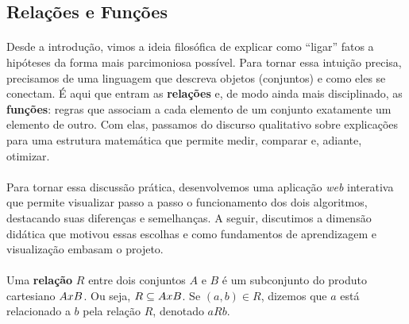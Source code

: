 \documentclass[12pt,a4paper]{article}
\def\times{\string x}%
\begin{document}
\subsection{Relações e Funções}

\paragraph{}
Desde a introdução, vimos a ideia filosófica de explicar como “ligar” fatos a hipóteses da forma mais parcimoniosa possível. Para tornar essa intuição precisa, precisamos de uma linguagem que descreva objetos (conjuntos) e como eles se conectam. É aqui que entram as \textbf{relações} e, de modo ainda mais disciplinado, as \textbf{funções}: regras que associam a cada elemento de um conjunto exatamente um elemento de outro. Com elas, passamos do discurso qualitativo sobre explicações para uma estrutura matemática que permite medir, comparar e, adiante, otimizar.

\paragraph{}
Para tornar essa discussão prática, desenvolvemos uma aplicação \textit{web} interativa que permite visualizar passo a passo o funcionamento dos dois algoritmos, destacando suas diferenças e semelhanças. A seguir, discutimos a dimensão didática que motivou essas escolhas e como fundamentos de aprendizagem e visualização embasam o projeto.

\paragraph{}
Uma \textbf{relação} \(R\) entre dois conjuntos \(A\) e \(B\) é um subconjunto do produto cartesiano \(A \times B\). Ou seja, \(R \subseteq A \times B\). Se \((a,b) \in R\), dizemos que \(a\) está relacionado a \(b\) pela relação \(R\), denotado \(aRb\).
\end{document}
